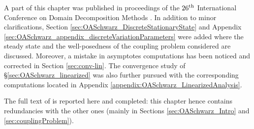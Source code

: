 
A part of this chapter was published in proceedings of the
$26^{\rm th}$ International Conference on Domain Decomposition Methods
\citep{clement_discrete_2021}.
In addition to minor clarifications, Section
\ref{sec:OASchwarz_DiscreteStationaryState} and Appendix
\ref{sec:OASchwarz_appendix_discreteVariationParameters} were added
where the steady state and the well-posedness
of the coupling problem considered are discussed.
Moreover, a mistake in asymptotes computations has been noticed
and corrected in Section \ref{sec:conv-lin}. The convergence
study of \S \ref{sec:OASchwarz_linearized} was also further pursued
with the corresponding computations located in Appendix
\ref{appendix:OASchwarz_LinearizedAnalysis}.
\par
The full text of \citep{clement_discrete_2021} is reported
here and completed: this chapter hence contains redundancies
with the other ones (mainly in
Sections \ref{sec:OASchwarz_Intro} and \ref{sec:couplingProblem}).
%
